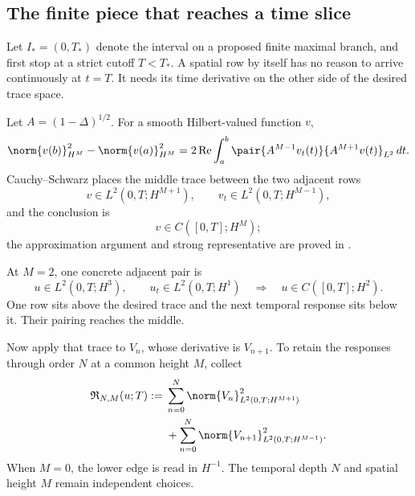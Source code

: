 \subsection{The finite piece that reaches a time slice}\label{sub:BodyFiniteAdjacentRectangles}

Let \(I_*=(0,T_*)\) denote the interval on a proposed finite maximal branch,
and first stop at a strict cutoff \(T<T_*\).  A spatial row by itself has no
reason to arrive continuously at \(t=T\).  It needs its time derivative on
the other side of the desired trace space.

Let \(A=(1-\Delta)^{1/2}\).  For a smooth Hilbert-valued function \(v\),
\begin{equation}\label{eq:BodyAdjacentTraceIdentity}
  \norm{v(b)}_{H^M}^2-
  \norm{v(a)}_{H^M}^2
  =2\operatorname{Re}\int_a^b
  \pair{A^{M-1}v_t(t)}{A^{M+1}v(t)}_{L^2}\,dt.
\end{equation}
Cauchy--Schwarz places the middle trace between the two adjacent rows
\begin{equation}\label{eq:BodyAdjacentTracePair}
  v\in L^2(0,T;H^{M+1}),
  \qquad
  v_t\in L^2(0,T;H^{M-1}),
\end{equation}
and the conclusion is
\begin{equation}\label{eq:BodyAdjacentTraceConclusion}
  v\in C([0,T];H^M);
\end{equation}
the approximation argument and strong representative are proved in
.

At \(M=2\), one concrete adjacent pair is
\begin{equation}\label{eq:FirstConcreteAdjacentPair}
  u\in L^2(0,T;H^3),
  \qquad
  u_t\in L^2(0,T;H^1)
  \quad\Longrightarrow\quad
  u\in C([0,T];H^2).
\end{equation}
One row sits above the desired trace and the next temporal response sits below
it.  Their pairing reaches the middle.

Now apply that trace to \(V_n\), whose derivative is \(V_{n+1}\).  To retain
the responses through order \(N\) at a common height \(M\), collect
\begin{equation}\label{eq:BodyRectangleNorm}
\begin{aligned}
  \mathfrak R_{N,M}(u;T)
  :={}&
  \sum_{n=0}^{N}
  \norm{V_n}_{L^2(0,T;H^{M+1})}^2
  \\
  &+
  \sum_{n=0}^{N}
  \norm{V_{n+1}}_{L^2(0,T;H^{M-1})}^2.
\end{aligned}
\end{equation}
When \(M=0\), the lower edge is read in \(H^{-1}\).  The temporal depth
\(N\) and spatial height \(M\) remain independent choices.

